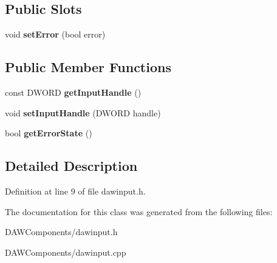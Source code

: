 \subsection*{Public Slots}
\begin{DoxyCompactItemize}
\item 
\hypertarget{class_d_a_w_inputs_1_1_input_base_ac7c056c9082dc4de0140a939bca469da_ac7c056c9082dc4de0140a939bca469da}{void {\bfseries set\-Error} (bool error)}\label{class_d_a_w_inputs_1_1_input_base_ac7c056c9082dc4de0140a939bca469da_ac7c056c9082dc4de0140a939bca469da}

\end{DoxyCompactItemize}
\subsection*{Public Member Functions}
\begin{DoxyCompactItemize}
\item 
\hypertarget{class_d_a_w_inputs_1_1_input_base_a73224efbabf4aad4b0895bcf51ba70d8_a73224efbabf4aad4b0895bcf51ba70d8}{const D\-W\-O\-R\-D {\bfseries get\-Input\-Handle} ()}\label{class_d_a_w_inputs_1_1_input_base_a73224efbabf4aad4b0895bcf51ba70d8_a73224efbabf4aad4b0895bcf51ba70d8}

\item 
\hypertarget{class_d_a_w_inputs_1_1_input_base_a95951cffd8b18decc69565cca4fa7551_a95951cffd8b18decc69565cca4fa7551}{void {\bfseries set\-Input\-Handle} (D\-W\-O\-R\-D handle)}\label{class_d_a_w_inputs_1_1_input_base_a95951cffd8b18decc69565cca4fa7551_a95951cffd8b18decc69565cca4fa7551}

\item 
\hypertarget{class_d_a_w_inputs_1_1_input_base_aad8f817d8e43f71d92d7cbd8eb360eb1_aad8f817d8e43f71d92d7cbd8eb360eb1}{bool {\bfseries get\-Error\-State} ()}\label{class_d_a_w_inputs_1_1_input_base_aad8f817d8e43f71d92d7cbd8eb360eb1_aad8f817d8e43f71d92d7cbd8eb360eb1}

\end{DoxyCompactItemize}


\subsection{Detailed Description}


Definition at line 9 of file dawinput.\-h.



The documentation for this class was generated from the following files\-:\begin{DoxyCompactItemize}
\item 
D\-A\-W\-Components/dawinput.\-h\item 
D\-A\-W\-Components/dawinput.\-cpp\end{DoxyCompactItemize}
